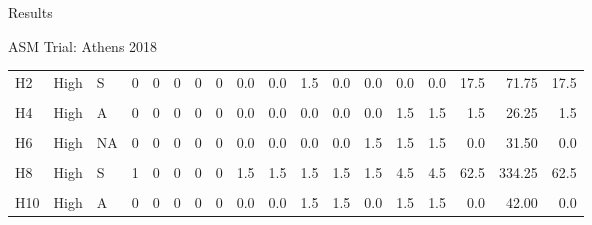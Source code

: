 \documentclass[
  ignorenonframetext,
]{beamer}
\begin{document}
\begin{frame}{Results}
\begin{block}{ASM Trial: Athens 2018}
\begin{table}
{\begin{tabular}[t]{lllrrrrrrrrrrrrrrr}
\addlinespace
H2 & High & S & 0 & 0 & 0 & 0 & 0 & 0.0 & 0.0 & 1.5 & 0.0 & 0.0 & 0.0 & 0.0 & 17.5 & 71.75 & 17.5\\
\cellcolor{gray!6}{H3} & \cellcolor{gray!6}{High} & \cellcolor{gray!6}{S} & \cellcolor{gray!6}{0} & \cellcolor{gray!6}{0} & \cellcolor{gray!6}{0} & \cellcolor{gray!6}{0} & \cellcolor{gray!6}{0} & \cellcolor{gray!6}{0.0} & \cellcolor{gray!6}{0.0} & \cellcolor{gray!6}{0.0} & \cellcolor{gray!6}{1.5} & \cellcolor{gray!6}{1.5} & \cellcolor{gray!6}{1.5} & \cellcolor{gray!6}{1.5} & \cellcolor{gray!6}{17.5} & \cellcolor{gray!6}{103.25} & \cellcolor{gray!6}{17.5}\\
H4 & High & A & 0 & 0 & 0 & 0 & 0 & 0.0 & 0.0 & 0.0 & 0.0 & 0.0 & 1.5 & 1.5 & 1.5 & 26.25 & 1.5\\
\cellcolor{gray!6}{H5} & \cellcolor{gray!6}{High} & \cellcolor{gray!6}{S} & \cellcolor{gray!6}{0} & \cellcolor{gray!6}{0} & \cellcolor{gray!6}{0} & \cellcolor{gray!6}{0} & \cellcolor{gray!6}{0} & \cellcolor{gray!6}{0.0} & \cellcolor{gray!6}{0.0} & \cellcolor{gray!6}{0.0} & \cellcolor{gray!6}{0.0} & \cellcolor{gray!6}{1.5} & \cellcolor{gray!6}{1.5} & \cellcolor{gray!6}{1.5} & \cellcolor{gray!6}{4.5} & \cellcolor{gray!6}{47.25} & \cellcolor{gray!6}{4.5}\\
H6 & High & NA & 0 & 0 & 0 & 0 & 0 & 0.0 & 0.0 & 0.0 & 0.0 & 1.5 & 1.5 & 1.5 & 0.0 & 31.50 & 0.0\\
\addlinespace
\cellcolor{gray!6}{H7} & \cellcolor{gray!6}{High} & \cellcolor{gray!6}{S} & \cellcolor{gray!6}{0} & \cellcolor{gray!6}{0} & \cellcolor{gray!6}{0} & \cellcolor{gray!6}{0} & \cellcolor{gray!6}{0} & \cellcolor{gray!6}{0.0} & \cellcolor{gray!6}{0.0} & \cellcolor{gray!6}{0.0} & \cellcolor{gray!6}{0.0} & \cellcolor{gray!6}{0.0} & \cellcolor{gray!6}{0.0} & \cellcolor{gray!6}{1.5} & \cellcolor{gray!6}{4.5} & \cellcolor{gray!6}{26.25} & \cellcolor{gray!6}{4.5}\\
H8 & High & S & 1 & 0 & 0 & 0 & 0 & 1.5 & 1.5 & 1.5 & 1.5 & 1.5 & 4.5 & 4.5 & 62.5 & 334.25 & 62.5\\
\cellcolor{gray!6}{H9} & \cellcolor{gray!6}{High} & \cellcolor{gray!6}{S} & \cellcolor{gray!6}{0} & \cellcolor{gray!6}{0} & \cellcolor{gray!6}{0} & \cellcolor{gray!6}{0} & \cellcolor{gray!6}{0} & \cellcolor{gray!6}{0.0} & \cellcolor{gray!6}{0.0} & \cellcolor{gray!6}{0.0} & \cellcolor{gray!6}{1.5} & \cellcolor{gray!6}{1.5} & \cellcolor{gray!6}{1.5} & \cellcolor{gray!6}{1.5} & \cellcolor{gray!6}{17.5} & \cellcolor{gray!6}{103.25} & \cellcolor{gray!6}{17.5}\\
H10 & High & A & 0 & 0 & 0 & 0 & 0 & 0.0 & 0.0 & 1.5 & 1.5 & 0.0 & 1.5 & 1.5 & 0.0 & 42.00 & 0.0\\

\end{tabular}}
\end{table}
\end{block}
\end{frame}
\end{document}
